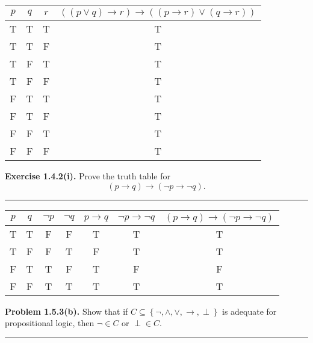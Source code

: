 \documentclass{article}
\begin{document}
\begin{table}[h!]
\begin{tabular}{ccc|c}
$p$ & $q$ & $r$ & $\left( \left(p \vee q \right) \to r \right) \to \left( \left( p \to r \right) \vee \left(q \to r \right) \right)$ \\ \hline
T   & T   & T   & T \\
T   & T   & F   & T \\
T   & F   & T   & T \\
T   & F   & F   & T \\
F   & T   & T   & T \\
F   & T   & F   & T \\
F   & F   & T   & T \\
F   & F   & F   & T \\
\end{tabular}
\end{table}

\newpage{}

\noindent\textbf{Exercise 1.4.2(i).} Prove the truth table for
\[
    \left( p \to q \right) \to \left( \lnot p \to \lnot q \right).
\]

\vspace{0.2cm}
\hrule{}
\vspace{0.2cm}

\begin{table}[h!]
\begin{tabular}{cc|ccccc}
$p$ & $q$ & $\lnot p$ & $\lnot q$ & $p \to q$ & $\lnot p \to \lnot q$ & $\left( p \to q \right) \to \left( \lnot p \to \lnot q \right)$ \\ \hline
T   & T   & F         & F         & T         & T                     & T \\
T   & F   & F         & T         & F         & T                     & T \\
F   & T   & T         & F         & T         & F                     & F \\
F   & F   & T         & T         & T         & T                     & T \\
\end{tabular}
\end{table}

\newpage{}

\noindent\textbf{Problem 1.5.3(b).} Show that if $C \subseteq \left\{
\lnot, \wedge, \vee, \to, \perp \right\}$ is adequate for propositional
logic, then $\lnot \in C$ or $\perp \in C$.

\vspace{0.2cm}
\hrule{}
\vspace{0.2cm}
\end{document}
